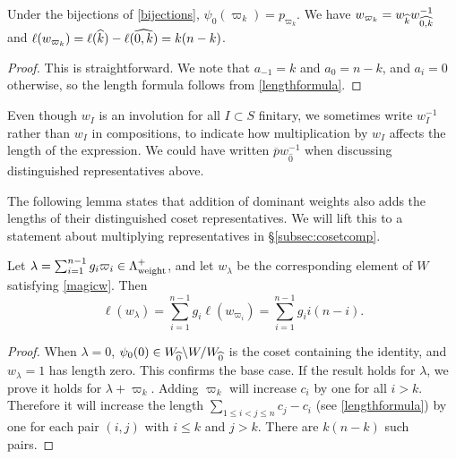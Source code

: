 \begin{lemma}\label{lemma distinguished reps for fundamental weights} Under the bijections of \eqref{bijections}, $\psi_0(\varpi_k) = p_{\varpi_k}$. We have $w_{\varpi_k} = w_{\widehat{k}} w_{\widehat{0,k}}^{-1}$ and  $\ell(w_{\varpi_k}) = \ell(\widehat{k}) - \ell(\widehat{0,k}) = k (n-k)$. \end{lemma}

\begin{proof} This is straightforward. We note that $a_{-1} = k$ and $a_0 = n-k$, and $a_i = 0$ otherwise, so the length formula follows from \eqref{lengthformula}. \end{proof}

\begin{remark} Even though $w_I$ is an involution for all $I \subset S$ finitary, we sometimes write $w_I^{-1}$ rather than $w_I$ in compositions, to indicate how multiplication by $w_I$ affects the length of the expression. We could have written $\overline{p} w_{\hat{0}}^{-1}$ when discussing distinguished representatives above. \end{remark}

The following lemma states that addition of dominant weights also adds the lengths of their distinguished coset representatives. We will lift this to a statement about multiplying representatives in \S\ref{subsec:cosetcomp}.

\begin{lemma} \label{lem:lengthadds} Let $\lambda = \sum_{i=1}^{n-1} g_i \varpi_i \in \Lambda^+_{\operatorname{weight}}$, and let $w_{\lambda}$ be the corresponding element of $W$ satisfying \eqref{magicw}. Then
\begin{equation} \label{lengthadds} \ell(w_{\lambda}) = \sum_{i=1}^{n-1} g_i \ell(w_{\varpi_i}) = \sum_{i=1}^{n-1} g_i i(n-i). \end{equation} 
\end{lemma}

\begin{proof} When $\lambda = 0$, $\psi_0(0) \in W_{\widehat{0}} \backslash W / W_{\widehat{0}}$ is the coset containing the identity, and $w_{\lambda} = 1$ has length zero. This confirms the base case. If the result holds for $\lambda$, we prove it holds for $\lambda + \varpi_k$. Adding $\varpi_k$ will increase $c_i$ by one for all $i > k$. Therefore it will increase the length $\sum_{1 \le i < j \le n} c_j - c_i$ (see \eqref{lengthformula}) by one for each pair $(i,j)$ with $i \le k$ and $j > k$. There are $k(n-k)$ such pairs. \end{proof}



